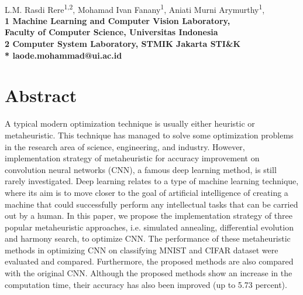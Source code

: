 \documentclass[10pt,letterpaper]{article}
\begin{document}
\vspace*{0.35in}


\begin{flushleft}{\Large
\textbf{}
}
\newline
\\
L.M. Rasdi Rere\textsuperscript{1,2},
Mohamad Ivan Fanany\textsuperscript{1},
Aniati Murni Arymurthy\textsuperscript{1},
\\
\bigskip
\bf{1} Machine Learning and Computer Vision Laboratory, \\Faculty of Computer Science, Universitas Indonesia\\
\bf{2} Computer System Laboratory, STMIK Jakarta STI\&K\\
\bigskip
* laode.mohammad@ui.ac.id

\end{flushleft}

\providecommand{\keywords}[1]{\textbf{\textit{Keywords---}} #1}

\section*{Abstract}
A typical modern optimization technique is usually either heuristic or metaheuristic. This technique has managed to solve some optimization problems in the research area of science, engineering, and industry. However, implementation strategy of metaheuristic for accuracy improvement on convolution neural networks (CNN), a famous deep learning method, is still rarely investigated.  Deep learning relates to a type of machine learning technique, where its aim is to move closer to the goal of artificial intelligence of creating a machine that could successfully perform any intellectual tasks that can be carried out by a human. In this paper, we propose the implementation strategy of three popular metaheuristic approaches, i.e. simulated annealing, differential evolution and harmony search, to optimize CNN. The performance of these metaheuristic methods in optimizing CNN on classifying MNIST and CIFAR dataset were evaluated and compared. Furthermore, the proposed methods are also compared with the original CNN. Although the proposed methods show an increase in the computation time, their accuracy has also been improved (up to 5.73 percent).
\bigskip
\end{document}
